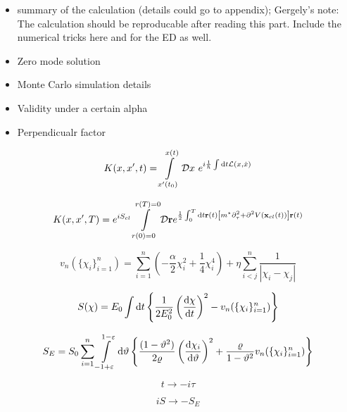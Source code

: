\documentclass[prb,twocolumn,showpacs,preprintnumbers,amsmath,amssymb, superscriptaddress]{revtex4-2}
\newcommand{\1}{{1\hspace*{-0.5ex} \textrm{l} \hspace*{0.5ex}}}
\begin{document}
\begin{itemize}
\item summary of the calculation (details could go to appendix); Gergely's note: The calculation should be reproducable after reading this part. Include the numerical tricks here and for the ED as well.
\item Zero mode solution
\item Monte Carlo simulation details
\item Validity under a certain alpha
\item Perpendicualr factor
\end{itemize}

\begin{equation}
K(x,x^\prime,t) = \int\limits_{x^\prime (t_0)}^{x(t)} \mathcal{D}x \,\, e^{i\frac{1}{\hbar} \int {\rm{d}}t \mathcal{L}(x,\dot{x})}
\end{equation}

\begin{equation}
K(x,x^\prime,T) = e^{iS_{cl}} \int\limits_{r(0) = 0}^{r(T) = 0} \mathcal{D}\textbf{r} e^{\frac{1}{2} \int_0^T {\rm{d}} t \textbf{r}(t) \left[ m^\star \partial_\tau^2 + \partial^2 V(\textbf{x}_{cl}(t)) \right] \textbf{r}(t)}
\end{equation}


\begin{equation}
v_n(\{\chi_i\}_{i=1}^n) = \sum_{i=1}^n \left(-\frac{\alpha}{2} \chi_i^2 + \frac{1}{4} \chi_i^4   \right) + \eta \sum_{i < j}^n \frac{1}{|\chi_i - \chi_j |}
\end{equation}

\begin{equation}
S(\chi) = E_0 \int {\rm{d}}t \left\lbrace \frac{1}{2E_0^2} \left( \frac{{\rm{d}}\chi}{{\rm{d}}t} \right)^2 - v_n(\{\chi_i\}_{i=1}^n) \right\rbrace
\end{equation}

\begin{equation}
S_E = S_0 \sum_{i = 1}^n \int\limits_{-1 + \varepsilon}^{1 - \varepsilon} {\rm{d}}\vartheta \left\lbrace \frac{(1 - \vartheta^2)}{2\varrho} \left( \frac{{\rm{d}}\chi_i}{{\rm{d}}\vartheta} \right)^2  + \frac{\varrho}{1 - \vartheta^2} v_n(\{\chi_i\}_{i=1}^n) \right\rbrace
\end{equation}

\begin{equation}
t \rightarrow -i\tau
\end{equation}

\begin{equation}
iS \rightarrow -S_E
\end{equation}
\end{document}
